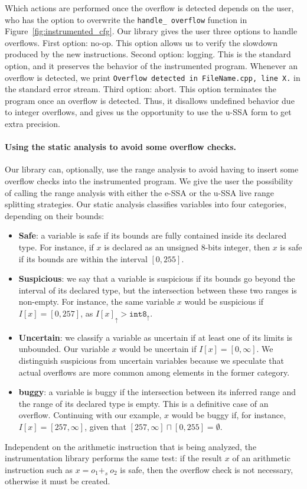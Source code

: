 \documentclass{sigplanconf}[10pt]
\newcommand{\ub}[1]{#1_{\uparrow}}
\begin{document}
Which actions are performed once the overflow is detected depends on the
user, who has the option to overwrite the \texttt{handle\_ overflow}
function in Figure~\ref{fig:instrumented_cfg}.
Our library gives the user three options to handle overflows. 
First option: no-op.
This option allows us to verify the slowdown produced by the new instructions.
Second option: logging.
This is the standard option, and it preserves the behavior of the instrumented
program.
Whenever an overflow is detected, we print \texttt{Overflow detected in
FileName.cpp, line X.} in the standard error stream.
Third option: abort.
This option terminates the program once an overflow is detected.
Thus, it disallows undefined behavior due to integer overflows, and gives us the
opportunity to use the u-SSA form to get extra precision.

\paragraph{Using the static analysis to avoid some overflow checks.}
Our library can, optionally, use the range analysis to avoid having to
insert some overflow checks into the instrumented program.
We give the user the possibility of calling the range analysis with either the
e-SSA or the u-SSA live range splitting strategies.
Our static analysis classifies variables into four categories, depending on
their bounds:
\begin{itemize}
\item \textbf{Safe}: a variable is safe if its bounds are fully contained
inside its declared type.
For instance, if $x$ is declared as an unsigned 8-bits integer, then $x$ is
safe if its bounds are within the interval $[0, 255]$.
\item \textbf{Suspicious}: we say that a variable is suspicious if its bounds
go beyond the interval of its declared type, but the intersection between
these two ranges is non-empty.
For instance, the same variable $x$ would be suspicious if
$I[x] = [0, 257]$, as $\ub{I[x]} > \ub{\mathtt{int8}}$.
\item \textbf{Uncertain}: we classify a variable as uncertain if at least one
of its limits is unbounded.
Our variable $x$ would be uncertain if $I[x] = [0, \infty]$.
We distinguish suspicious from uncertain variables because we speculate that
actual overflows are more common among elements in the former category.
\item \textbf{buggy}: a variable is buggy if the intersection between its
inferred range and the range of its declared type is empty.
This is a definitive case of an overflow.
Continuing with our example, $x$ would be buggy if, for instance,
$I[x] = [257, \infty]$, given that $[257, \infty] \sqcap [0, 255] = \emptyset$.
\end{itemize}
Independent on the arithmetic instruction that is being analyzed, the
instrumentation library performs the same test:
if the result $x$ of an arithmetic instruction such as $x = o_1 +_s \ o_2$ is
safe, then the overflow check is not necessary, otherwise it must be
created.
\end{document}
